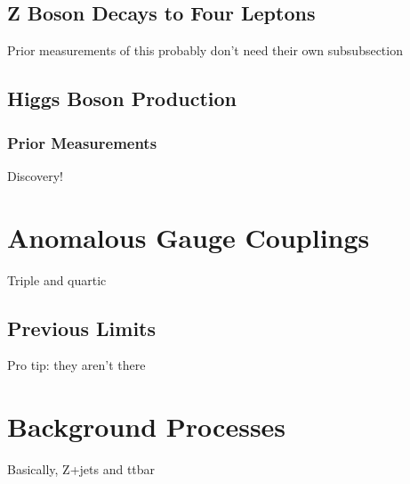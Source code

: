 \subsection{Z Boson Decays to Four Leptons}
Prior measurements of this probably don't need their own subsubsection


\subsection{Higgs Boson Production}\label{sec:Hproduction}

\subsubsection{Prior Measurements}\label{sec:Hresults}
Discovery!



\section{Anomalous Gauge Couplings}
Triple and quartic

\subsection{Previous Limits}
Pro tip: they aren't there



\section{Background Processes}\label{sec:bkgPheno}
Basically, Z+jets and ttbar
